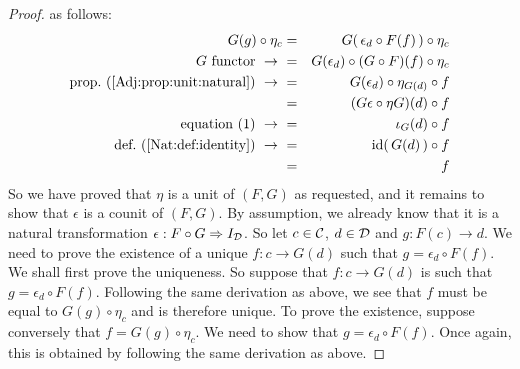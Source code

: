 \begin{proof}
    as follows:
        \begin{eqnarray*}G(g)\circ\eta_{c}
            &=&G(\,\epsilon_{d}\circ F(f)\,)\circ\eta_{c}\\
            \mbox{$G$ functor}\ \to\ 
            &=&G(\epsilon_{d})\circ(G\circ F)(f)\circ\eta_{c}\\
            \mbox{prop.~(\ref{Adj:prop:unit:natural})}\ \to\ 
            &=&G(\epsilon_{d})\circ\eta_{G(d)}\circ f\\
            &=&(G\epsilon\circ\eta G)(d)\circ f\\
            \mbox{equation~$(1)$}\ \to\  
            &=&\iota_{G}(d)\circ f\\
            \mbox{def.~(\ref{Nat:def:identity})}\ \to\ 
            &=&\id(\,G(d)\,)\circ f\\
            &=&f
        \end{eqnarray*}
    So we have proved that $\eta$ is a unit of $(F,G)$ as requested, and it 
    remains to show that $\epsilon$ is a counit of $(F,G)$. By assumption,
    we already know that it is a natural transformation $\epsilon:F\circ G
    \Rightarrow I_{\cal D}$. So let $c\in\mbox{$\cal C$}$, $d\in\mbox{$\cal D$}$ and $g:F(c)\to d$.
    We need to prove the existence of a unique $f:c\to G(d)$ such that 
    $g=\epsilon_{d}\circ F(f)$. We shall first prove the uniqueness. So 
    suppose that $f:c\to G(d)$ is such that $g=\epsilon_{d}\circ F(f)$.
    Following the same derivation as above, we see that $f$ must be equal
    to $G(g)\circ\eta_{c}$ and is therefore unique. To prove the existence,
    suppose conversely that $f=G(g)\circ\eta_{c}$. We need to show that
    $g=\epsilon_{d}\circ F(f)$. Once again, this is obtained by following
    the same derivation as above.
\end{proof}
